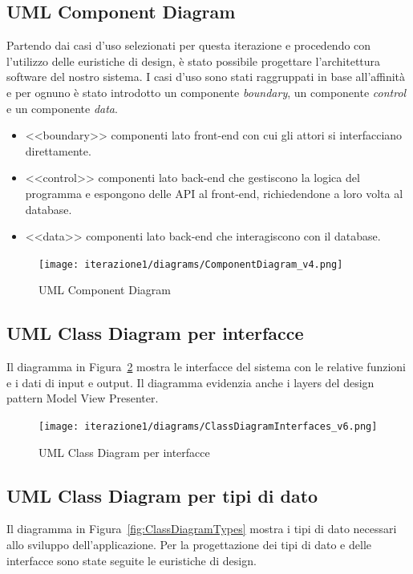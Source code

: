 \subsection{UML Component Diagram}
Partendo dai casi d'uso selezionati per questa iterazione e procedendo con l'utilizzo delle euristiche di design, è stato possibile progettare l'architettura software del nostro sistema. I casi d'uso sono stati raggruppati in base all'affinità e per ognuno è stato introdotto un componente \textit{boundary}, un componente \textit{control} e un componente \textit{data}. 

\begin{itemize}
    \item <<boundary>> componenti lato front-end con cui gli attori si interfacciano direttamente. 
    \item <<control>>  componenti lato back-end che gestiscono la logica del programma e espongono delle API al front-end, richiedendone a loro volta al database.
    \item <<data>> componenti lato back-end che interagiscono con il database.
\end{itemize}

\begin{figure}[htbp]
    \texttt{[image: iterazione1/diagrams/ComponentDiagram\_v4.png]}
    \centering
    \caption{UML Component Diagram}\label{fig:componentDiagram}
\end{figure}

\newpage

\subsection{UML Class Diagram per interfacce}
Il diagramma in Figura~\ref{fig:ClassDiagramInterfaces} mostra le interfacce del sistema con le relative funzioni e i dati di input e output. Il diagramma evidenzia anche i layers del design pattern Model View Presenter.

\begin{figure}[htbp]
    \texttt{[image: iterazione1/diagrams/ClassDiagramInterfaces\_v6.png]}
    \centering
    \caption{UML Class Diagram per interfacce}
    \label{fig:ClassDiagramInterfaces}
\end{figure}

\newpage

\subsection{UML Class Diagram per tipi di dato}
Il diagramma in Figura~\ref{fig:ClassDiagramTypes} mostra i tipi di dato necessari allo sviluppo dell'applicazione. Per la progettazione dei tipi di dato e delle interfacce sono state seguite le euristiche di design. 

